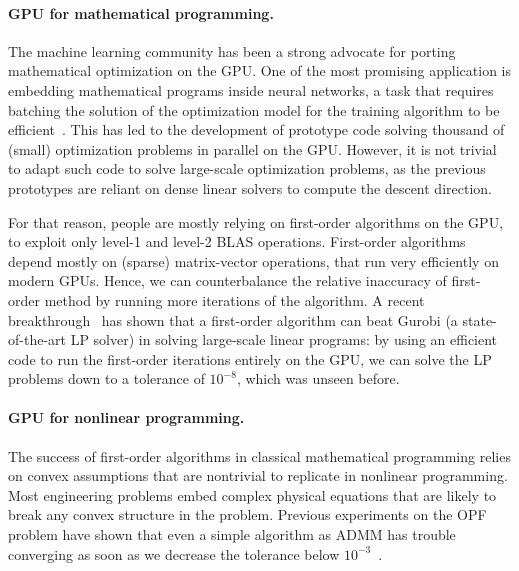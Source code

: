 \paragraph{GPU for mathematical programming.}
The machine learning community has been a strong advocate
for porting mathematical optimization on the GPU. One of the most
promising application is embedding mathematical programs
inside neural networks, a task that requires batching the solution
of the optimization model for the training algorithm to be efficient~\cite{amos2017optnet,pineda2022theseus}.
This has led to the development of prototype code solving
thousand of (small) optimization problems in parallel on the GPU.
However, it is not trivial to adapt such code to solve large-scale optimization problems,
as the previous prototypes are reliant on dense linear solvers
to compute the descent direction.

For that reason, people are mostly relying on first-order algorithms on the GPU,
to exploit only level-1 and level-2 BLAS operations.
First-order algorithms depend mostly on (sparse) matrix-vector operations, that run
very efficiently on modern GPUs. Hence, we can counterbalance
the relative inaccuracy of first-order method by running more
iterations of the algorithm.
A recent breakthrough~\cite{lu2023cupdlp,lu2023cupdlp2} has shown that a first-order algorithm
can beat Gurobi (a state-of-the-art LP solver) in solving large-scale linear programs:
by using an efficient code to run the first-order iterations entirely on the GPU,
we can solve the LP problems down to a tolerance of $10^{-8}$, which was unseen before.


\paragraph{GPU for nonlinear programming.}
The success of first-order algorithms in classical mathematical programming
relies on convex assumptions that are nontrivial to replicate
in nonlinear programming. Most engineering problems embed complex
physical equations that are likely to break any convex structure in the problem.
Previous experiments on the OPF problem have shown that even a simple
algorithm as ADMM has trouble converging as soon as we decrease the
tolerance below $10^{-3}$~\cite{kim2021leveraging}.

